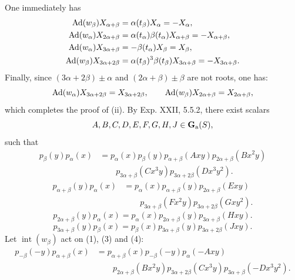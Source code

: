 One immediately has
\[
\begin{aligned}
\operatorname{Ad}(w_\beta)X_{\alpha+\beta}&=\alpha(t_\beta)X_\alpha=-X_\alpha,\\
\operatorname{Ad}(w_\alpha)X_{2\alpha+\beta}&=\alpha(t_\alpha)\beta(t_\alpha)X_{\alpha+\beta}=-X_{\alpha+\beta},\\
\operatorname{Ad}(w_\alpha)X_{3\alpha+\beta}&=-\beta(t_\alpha)X_\beta=X_\beta,\\
\operatorname{Ad}(w_\beta)X_{3\alpha+2\beta}&=\alpha(t_\beta)^3\beta(t_\beta)X_{3\alpha+\beta}=-X_{3\alpha+\beta}.
\end{aligned}
\]
Finally, since $(3\alpha+2\beta)\pm\alpha$ and $(2\alpha+\beta)\pm\beta$ are not roots, one has:
\[
\operatorname{Ad}(w_\alpha)X_{3\alpha+2\beta}=X_{3\alpha+2\beta},\qquad\operatorname{Ad}(w_\beta)X_{2\alpha+\beta}=X_{2\alpha+\beta},
\]
which completes the proof of (ii).
By Exp. XXII, 5.5.2, there exist scalars
\[
A,B,C,D,E,F,G,H,J\in\mathbf{G}_{\mathrm{a}}(S),
\]
such that
\begin{equation}\tag{1}
\begin{aligned}
p_\beta(y)p_\alpha(x)&=p_\alpha(x)p_\beta(y)p_{\alpha+\beta}(Axy)p_{2\alpha+\beta}(Bx^2y)\\
&\qquad p_{3\alpha+\beta}(Cx^3y)p_{3\alpha+2\beta}(Dx^3y^2).
\end{aligned}
\end{equation}
\begin{equation}\tag{2}
\begin{aligned}
p_{\alpha+\beta}(y)p_\alpha(x)&=p_\alpha(x)p_{\alpha+\beta}(y)p_{2\alpha+\beta}(Exy)\\
&\qquad p_{3\alpha+\beta}(Fx^2y)p_{3\alpha+2\beta}(Gxy^2).
\end{aligned}
\end{equation}
\begin{equation}\tag{3}
p_{2\alpha+\beta}(y)p_\alpha(x)=p_\alpha(x)p_{2\alpha+\beta}(y)p_{3\alpha+\beta}(Hxy).
\end{equation}
\begin{equation}\tag{4}
p_{3\alpha+\beta}(y)p_\beta(x)=p_\beta(x)p_{3\alpha+\beta}(y)p_{3\alpha+2\beta}(Jxy).
\end{equation}
Let $\operatorname{int}(w_\beta)$ act on (1), (3) and (4):
\begin{equation}\tag{5}
\begin{aligned}
p_{-\beta}(-y)p_{\alpha+\beta}(x)&=p_{\alpha+\beta}(x)p_{-\beta}(-y)p_\alpha(-Axy)\\
&\qquad p_{2\alpha+\beta}(Bx^2y)p_{3\alpha+2\beta}(Cx^3y)p_{3\alpha+\beta}(-Dx^3y^2).
\end{aligned}
\end{equation}
